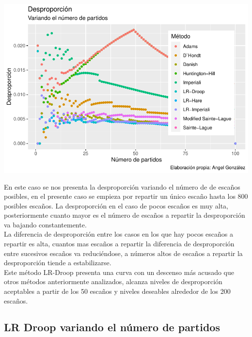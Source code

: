 \documentclass[12pt,a4paper,]{book}
\numberwithin{dummy}{section}
\theoremstyle{ocrenumbox}
\theoremstyle{blacknumex}
\theoremstyle{blacknumbox}
\theoremstyle{ocrenum}
\theoremstyle{ocrenum}
\begin{document}
\begin{center}\includegraphics[width=0.95\linewidth]{figurasR/unnamed-chunk-56-1} \end{center}

En este caso se nos presenta la desproporción variando el número de de
escaños posibles, en el presente caso se empieza por repartir un único
escaño hasta los 800 posibles escaños. La desproporción en el caso de
pocos escaños es muy alta, posteriormente cuanto mayor es el número de
escaños a repartir la desproporción va bajando constantemente.\\
La diferencia de desproporción entre los casos en los que hay pocos
escaños a repartir es alta, cuantos mas escaños a repartir la diferencia
de desproporción entre sucesivos escaños va reduciéndose, a números
altos de escaños a repartir la desproporción tiende a estabilizarse.\\
Este método LR-Droop presenta una curva con un descenso más acusado que
otros métodos anteriormente analizados, alcanza niveles de desproporción
aceptables a partir de los 50 escaños y niveles deseables alrededor de
los 200 escaños.

\hypertarget{lr-droop-variando-el-nuxfamero-de-partidos}{%
\subsection{LR Droop variando el número de
partidos}\label{lr-droop-variando-el-nuxfamero-de-partidos}}
\end{document}
